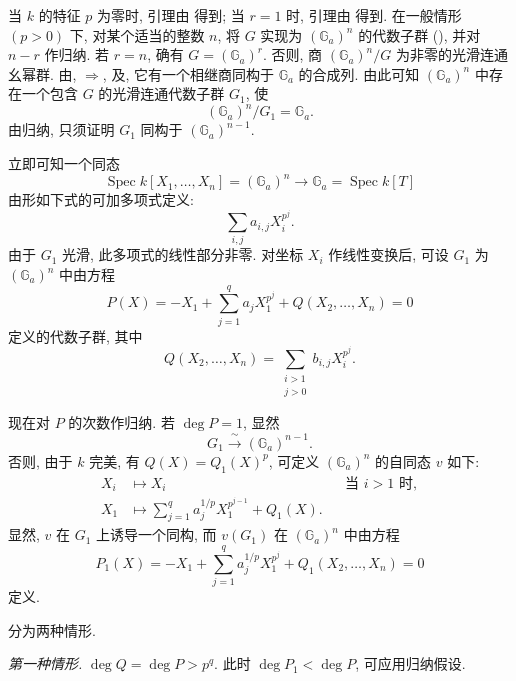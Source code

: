 当 \(k\) 的特征 \(p\) 为零时, 引理由 得到;
当 \(r=1\) 时, 引理由 得到.
在一般情形 \((p>0)\) 下,
对某个适当的整数 \(n\), 将 \(G\) 实现为 \((\mathbb G_a)^n\) 的代数子群
(), 并对 \(n-r\) 作归纳.
若 \(r=n\), 确有 \(G=(\mathbb G_a)^r\).
否则, 商 \((\mathbb G_a)^n/G\) 为非零的光滑连通幺幂群.
由,
\(\Rightarrow\),
及,
它有一个相继商同构于 \(\mathbb G_a\) 的合成列.
由此可知 \((\mathbb G_a)^n\) 中存在一个包含 \(G\) 的光滑连通代数子群 \(G_1\), 使
\[
  (\mathbb G_a)^n/G_1=\mathbb G_a.
\]
由归纳, 只须证明 \(G_1\) 同构于 \((\mathbb G_a)^{n-1}\).

立即可知一个同态
\[
  \operatorname{Spec}k[X_1,\ldots,X_n]=(\mathbb G_a)^n
  \longrightarrow
  \mathbb G_a=\operatorname{Spec}k[T]
\]
由形如下式的可加多项式定义:
\[
  \sum_{i,j}a_{i,j}X_i^{p^j}.
\]
由于 \(G_1\) 光滑, 此多项式的线性部分非零.
对坐标 \(X_i\) 作线性变换后, 可设 \(G_1\) 为 \((\mathbb G_a)^n\)
中由方程
\[
  \tag{\(*\)}
  P(X)=-X_1+\sum_{j=1}^{q}a_jX_1^{p^j}
    +Q(X_2,\ldots,X_n)=0
\]
定义的代数子群, 其中
\[
  Q(X_2,\ldots,X_n)
    =\sum_{\substack{i>1\\j>0}}b_{i,j}X_i^{p^j}.
\]

现在对 \(P\) 的次数作归纳. 若 \(\deg P=1\), 显然
\[
  G_1\xrightarrow{\ \sim\ }(\mathbb G_a)^{n-1}.
\]
否则, 由于 \(k\) 完美, 有 \(Q(X)=Q_1(X)^p\),
可定义 \((\mathbb G_a)^n\) 的自同态 \(v\) 如下:
\[
\begin{aligned}
  X_i&\longmapsto X_i &&\text{当 \(i>1\) 时},\\
  X_1&\longmapsto
    \sum_{j=1}^{q}a_j^{1/p}X_1^{p^{j-1}}+Q_1(X).
\end{aligned}
\]
显然, \(v\) 在 \(G_1\) 上诱导一个同构, 而 \(v(G_1)\) 在 \((\mathbb G_a)^n\)
中由方程
\[
  \tag{\(*\)\(_1\)}
  P_1(X)=-X_1+\sum_{j=1}^{q}a_j^{1/p}X_1^{p^j}
    +Q_1(X_2,\ldots,X_n)=0
\]
定义.

分为两种情形.

\medskip\noindent\textit{第一种情形.}\quad
\(\deg Q=\deg P>p^q\). 此时 \(\deg P_1<\deg P\), 可应用归纳假设.

